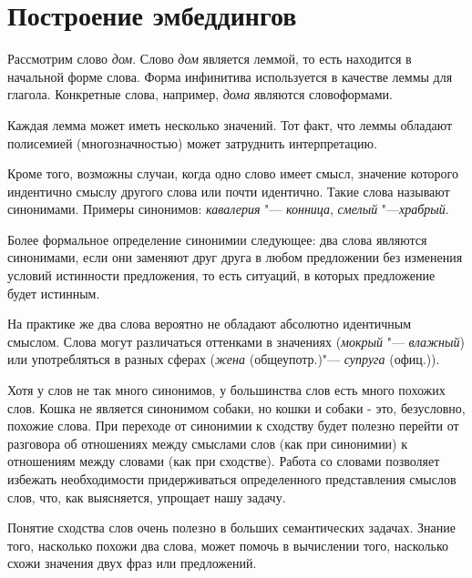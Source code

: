 \documentclass[coursework]{SCWorks}
\begin{document}
\section{Построение эмбеддингов}
Рассмотрим слово \textit{дом}. Слово \textit{дом} является леммой, то есть находится в начальной форме слова. Форма инфинитива используется в качестве леммы для глагола. Конкретные слова, например, \textit{дома} являются словоформами.

Каждая лемма может иметь несколько значений. Тот факт, что леммы обладают полисемией (многозначностью) может затруднить интерпретацию. 

Кроме того, возможны случаи, когда одно слово имеет смысл, значение которого индентично смыслу другого слова или почти идентично. 
Такие слова называют синонимами. Примеры синонимов: \textit{кавалерия} "--- \textit{конница}, \textit{смелый} "---\textit{храбрый}.

Более формальное определение синонимии следующее: два слова являются синонимами, если они заменяют друг друга в любом предложении без изменения условий истинности предложения, то есть ситуаций, в которых предложение будет истинным.

На практике же два слова вероятно не обладают абсолютно идентичным смыслом. Слова могут различаться оттенками в значениях (\textit{мокрый} "--- \textit{влажный}) или употребляться в разных сферах (\textit{жена} (общеупотр.)"--- \textit{супруга} (офиц.)).

Хотя у слов не так много синонимов, у большинства слов есть много похожих слов. Кошка не является синонимом собаки, но кошки и собаки - это, безусловно, похожие слова. При переходе от синонимии к сходству будет полезно перейти от разговора об отношениях между смыслами слов (как при синонимии) к отношениям между словами (как при сходстве). Работа со словами позволяет избежать необходимости придерживаться определенного представления смыслов слов, что, как выясняется, упрощает нашу задачу. 

Понятие сходства слов очень полезно в больших семантических задачах. Знание того, насколько похожи два слова, может помочь в вычислении того, насколько схожи значения двух фраз или предложений.
\end{document}
